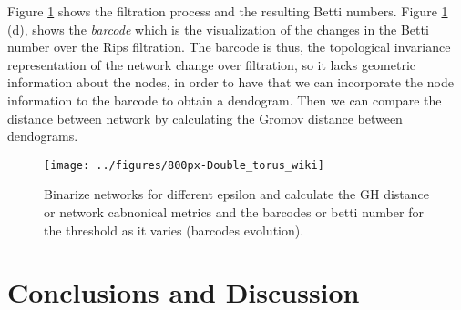 \documentclass[onecollarge,runningheads]{svjour2}
\begin{document}
Figure \ref{fig:ph1} shows the filtration process and the resulting Betti numbers. Figure \ref{fig:ph1} (d), shows the \textit{barcode} which is the visualization of the changes in the Betti number over the Rips filtration. The barcode is thus, the topological invariance representation of the network change over filtration, so it lacks geometric information about the nodes, in order to have that we can incorporate the node information to the barcode to obtain a dendogram. Then we can compare the distance between network by calculating the Gromov distance between dendograms.
\begin{figure}[h]
        \centering
        \texttt{[image: ../figures/800px-Double\_torus\_wiki]}
        \caption{Binarize networks for different epsilon and calculate the GH distance or network cabnonical metrics and the barcodes or betti number for the threshold as it varies (barcodes evolution).
}
\label{fig:ph1}
\end{figure}


\section{Conclusions and Discussion}
\label{se:conclusion}
\end{document}
